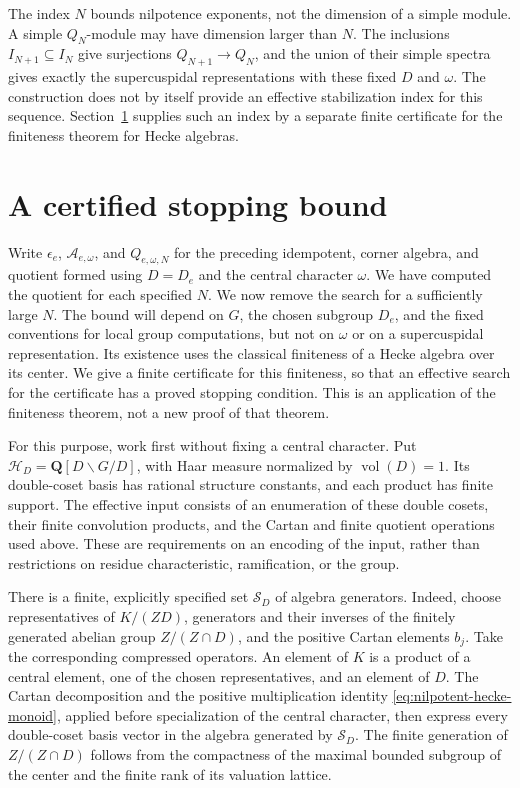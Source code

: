 \documentclass[10pt,letterpaper]{amsart}
\numberwithin{equation}{section}
\theoremstyle{remark}
\begin{document}
The index $N$ bounds nilpotence exponents, not the dimension of a simple
module. A simple $Q_N$-module may have dimension larger than $N$.
The inclusions $I_{N+1}\subseteq I_N$ give surjections $Q_{N+1}\to Q_N$,
and the union of their simple spectra gives exactly the supercuspidal
representations with these fixed $D$ and $\omega$. The construction does
not by itself provide an effective stabilization index for this sequence.
Section~\ref{sec:certified-level-termination} supplies such an index by
a separate finite certificate for the finiteness theorem for Hecke algebras.


\section{A certified stopping bound}
\label{sec:certified-level-termination}

Write $\epsilon_e$, $\mathcal A_{e,\omega}$, and $Q_{e,\omega,N}$ for
the preceding idempotent, corner algebra, and quotient formed using
$D=D_e$ and the central character $\omega$. We have computed the quotient
for each specified $N$. We now remove the search for a sufficiently large $N$. The bound
will depend on $G$, the chosen subgroup $D_e$, and the fixed conventions
for local group computations, but not on $\omega$ or on a supercuspidal
representation. Its existence uses the classical finiteness of a Hecke
algebra over its center. We give a finite certificate for this finiteness,
so that an effective search for the certificate has a proved stopping
condition. This is an application of the finiteness theorem, not a new
proof of that theorem.

For this purpose, work first without fixing a central character. Put
$\mathcal H_D=\mathbf Q[D\backslash G/D]$, with Haar measure normalized
by $\operatorname{vol}(D)=1$. Its double-coset basis has rational
structure constants, and each product has finite support. The effective
input consists of an enumeration of these double cosets, their finite
convolution products, and the Cartan and finite quotient operations used
above. These are requirements on an encoding of the input, rather than
restrictions on residue characteristic, ramification, or the group.

There is a finite, explicitly specified set $\mathcal S_D$ of algebra
generators. Indeed, choose representatives of $K/(ZD)$, generators and
their inverses of the finitely generated abelian group $Z/(Z\cap D)$,
and the positive Cartan elements $b_j$. Take the corresponding compressed
operators. An element of $K$ is a product of a central element, one of the
chosen representatives, and an element of $D$. The Cartan decomposition
and the positive multiplication identity
\eqref{eq:nilpotent-hecke-monoid}, applied before specialization of the
central character, then express every double-coset basis vector in the
algebra generated by $\mathcal S_D$. The finite generation of
$Z/(Z\cap D)$ follows from the compactness of the maximal bounded
subgroup of the center and the finite rank of its valuation lattice.
\end{document}
